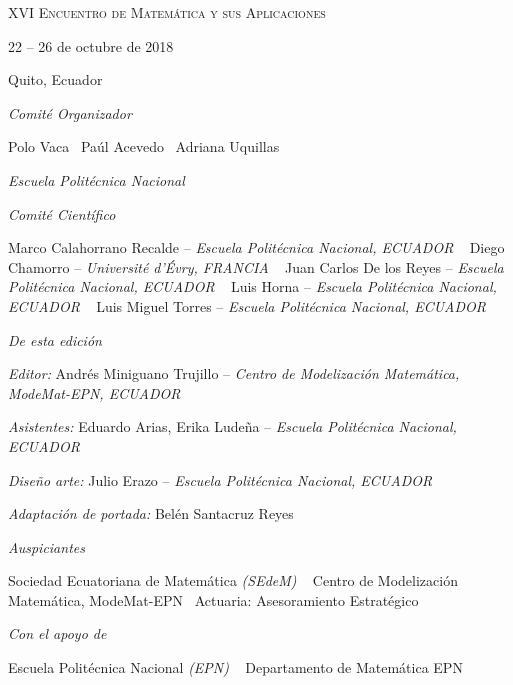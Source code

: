 \documentclass[a5paper,doc,10pt,noapacite]{apa6}
\newcommand{\bull}{\textbullet \ }
\newcommand{\EPN}{Escuela Politécnica Nacional}
\newcommand{\Modemat}{Centro de Modelización Matemática, ModeMat-EPN}%
\begin{document}
\newpage
{}
\mbox{}
\vfill
{
\footnotesize
\textsc{XVI Encuentro de Matemática y sus Aplicaciones}

22 -- 26 de octubre de 2018

Quito, Ecuador

%
\vspace{1\baselineskip}
\emph{Comité Organizador}
\begin{spacing}{1.2}
\scriptsize
	Polo Vaca		\bull Paúl Acevedo	\bull Adriana Uquillas	
	
	\emph{\EPN}
\end{spacing}

%
\vspace{1\baselineskip}
\emph{Comité Científico}
\begin{spacing}{1.2}
\scriptsize
	Marco Calahorrano Recalde	--	\emph{\EPN, ECUADOR} 		\bull 
	Diego Chamorro			-- 	\emph{Université d'Évry, FRANCIA} \bull
	Juan Carlos De los Reyes		-- 	\emph{\EPN, ECUADOR} \bull
	Luis Horna				--	\emph{\EPN, ECUADOR} \bull
	Luis Miguel Torres			--	\emph{\EPN, ECUADOR} 
%		
\end{spacing}

%
\vspace{1\baselineskip}
\emph{De esta edición}
\begin{spacing}{1.2}
\scriptsize
	\emph{Editor:} 	Andrés Miniguano Trujillo 	--	\emph{\Modemat, ECUADOR}
	
	\emph{Asistentes:} Eduardo Arias, Erika Ludeña -- \emph{\EPN, ECUADOR}
	
	\emph{Diseño arte:} Julio Erazo -- \emph{\EPN, ECUADOR}
	
	\emph{Adaptación de portada:} Belén Santacruz Reyes
%		
\end{spacing}

%
\vspace{1\baselineskip}
\emph{Auspiciantes}
\begin{spacing}{1.2}
\scriptsize
	Sociedad Ecuatoriana de Matemática \emph{(SEdeM)}				\bull
	\Modemat													\bull
	Actuaria: Asesoramiento Estratégico
\end{spacing}

%
\vspace{1\baselineskip}
\emph{Con el apoyo de}
\begin{spacing}{1.2}
\scriptsize
	Escuela Politécnica Nacional \emph{(EPN)}						\bull
	Departamento de Matemática EPN
\end{spacing}


}
\end{document}
